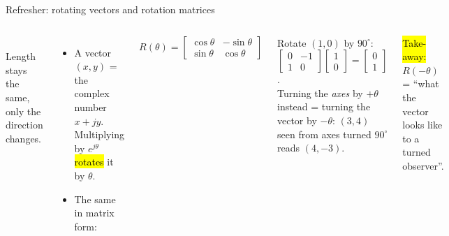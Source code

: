 \documentclass[aspectratio=169,10pt]{beamer}
\begin{document}
\begin{frame}[t]{Refresher: rotating vectors and rotation matrices}
\begin{columns}[T,onlytextwidth]
\centering
{}\\
\small Length stays the same, only the direction changes.
\begin{itemize}\small
\item A vector $(x,y)$ = the complex number $x+jy$. Multiplying by $e^{j\theta}$ \hl{rotates} it by $\theta$.
\item The same in matrix form:
\end{itemize}
\begin{eqbox}\centering
$R(\theta)=\begin{bmatrix}\cos\theta&-\sin\theta\\ \sin\theta&\cos\theta\end{bmatrix}$
\end{eqbox}
\begin{defbox}[Example]
\small Rotate $(1,0)$ by $90^\circ$: $\begin{bmatrix}0&-1\\1&0\end{bmatrix}\!\begin{bmatrix}1\\0\end{bmatrix}=\begin{bmatrix}0\\1\end{bmatrix}$.\\[1mm]
Turning the \emph{axes} by $+\theta$ instead = turning the vector by $-\theta$: $(3,4)$ seen from axes turned $90^\circ$ reads $(4,-3)$.
\end{defbox}
\small\hl{Take-away:} $R(-\theta)$ = ``what the vector looks like to a turned observer''.
\end{columns}
\end{frame}
\end{document}
